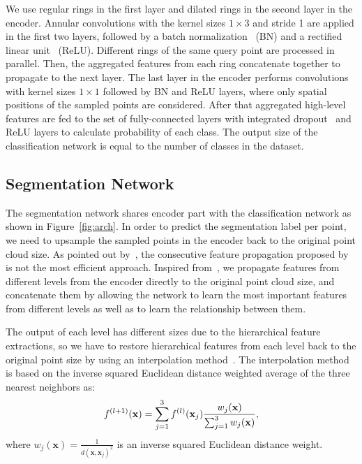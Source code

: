 \documentclass[10pt,twocolumn,letterpaper]{article}
\begin{document}
We use regular rings in the first layer and dilated rings in the second layer in the encoder. Annular convolutions with the kernel sizes $1\times3$ and stride 1 are applied in the first two layers, followed by a batch normalization~\cite{ioffe2015batch} (BN) and a rectified linear unit~\cite{nair2010rectified} (ReLU). Different rings of the same query point are processed in parallel. Then, the aggregated features from each ring concatenate together to propagate to the next layer. The last layer in the encoder performs convolutions with kernel sizes $1\times1$ followed by BN and ReLU layers, where only spatial positions of the sampled points are considered. After that aggregated high-level features are fed to the set of fully-connected layers with integrated dropout~\cite{JMLR:v15:srivastava14a} and ReLU layers to calculate probability of each class. The output size of the classification network is equal to the number of classes in the dataset.
\vspace{-1mm}
\subsection{Segmentation Network}\vspace{-1mm}
The segmentation network shares encoder part with the classification network as shown in Figure~\ref{fig:arch}. In order to predict the segmentation label per point, we need to upsample the sampled points in the encoder back to the original point cloud size. As pointed out by~\cite{yu2018pu}, the consecutive feature propagation proposed by~\cite{qi2017pointnet++} is not the most efficient approach. Inspired from~\cite{yu2018pu}, we propagate features from different levels from the encoder directly to the original point cloud size, and concatenate them by allowing the network to learn the most important features from different levels as well as to learn the relationship between them.

The output of each level has different sizes due to the hierarchical feature extractions, so we have to restore hierarchical features from each level back to the original point size by using an interpolation method~\cite{qi2017pointnet++}. The interpolation method is based on the inverse squared Euclidean distance weighted average of the three nearest neighbors as:\vspace{-2mm}
\begin{equation}
f^{(l+1)}(\mathbf{x}) = \sum^3_{j=1} f^{(l)}(\mathbf{x}_j)\frac{w_j(\mathbf{x})}{\sum^3_{j=1} w_j(\mathbf{x})},\vspace{-1.5mm}
\end{equation}
where $w_j(\mathbf{x})=\frac{1}{d(\mathbf{x},\mathbf{x}_j)^2}$ is an inverse squared Euclidean distance weight.
\end{document}
